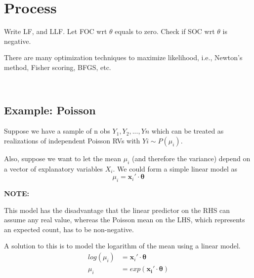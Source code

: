 \documentclass[12pt]{article}
\title{}
\author{}
\date{}
\begin{document}



\section{Process}

Write LF, and LLF.
Let FOC wrt $ \theta $ equals to zero.
Check if SOC wrt $ \theta $ is negative.


There are many optimization techniques to maximize likelihood, i.e., Newton's method,
Fisher scoring, BFGS, etc.


\noindent{}\\





\subsection{Example: Poisson}

Suppose we have a sample of n obs $ Y_1, Y_2, ..., Yn $ which can be treated as 
realizations of independent Poisson RVs with $ Yi \sim P(\mu_{i}) $. 

Also, suppose we want to let the mean $ \mu_{i} $ (and therefore the variance) 
depend on a vector of explanatory variables $ X_{i} $. We could form a simple linear
model as 
\begin{equation*}
\mu_{i} = \bm{x}_{i}' \cdot \bm{\theta}
\end{equation*}


{\textbf {NOTE:}}

This model has the disadvantage that the linear predictor on the RHS can assume any
real value, whereas the Poisson mean on the LHS, which represents an expected count, 
has to be non-negative. 

A solution to this is to model the logarithm of the mean using a linear model.
\begin{align*}
		log(\mu_{i}) &= \bm{x}_{i}' \cdot \bm{\theta}\\
		\mu_{i} &= exp(\bm{x_{i}}' \cdot \bm{\theta})
\end{align*}
\end{document}
